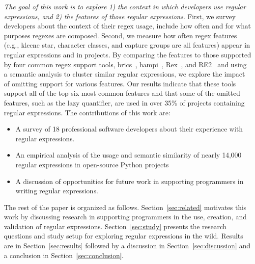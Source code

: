 \emph{The goal of this work is to explore 1) the context in which developers use regular expressions, and 2) the features of those regular expressions}.
First, we survey developers about the context of their regex usage, include how often and for what purposes regexes are composed.
Second, we measure how often regex features (e.g., kleene star, character classes, and capture groups are all features) appear in regular expressions and in projects.
By comparing the features to those supported by four common regex support tools, brics~\cite{brics}, hampi~\cite{hampi}, Rex~\cite{rex}, and RE2~\cite{re2} and using a semantic analysis to cluster similar regular expressions,
we explore the impact of omitting support for various features.
Our results indicate that these tools support all of the top six most common features and that some of the omitted features, such as the lazy quantifier, are used in over 35\% of projects containing regular expressions.
The contributions of this work are:
\begin{itemize}
	\item A survey of 18 professional software developers about their experience with regular expressions.
	\item An empirical analysis of the usage and semantic similarity of nearly 14,000 regular expressions in  open-source Python projects
	\item A discussion of opportunities for future work in supporting programmers in writing regular expressions.
\end{itemize}

The rest of the paper is organized as follows. Section~\ref{sec:related} motivates this work by discussing research in supporting programmers in the use, creation, and validation of regular expressions. Section~\ref{sec:study} presents the research questions and study setup for exploring regular expressions in the wild. Results are in Section~\ref{sec:results} followed by a discussion in Section~\ref{sec:discussion} and a conclusion in Section~\ref{sec:conclusion}.
